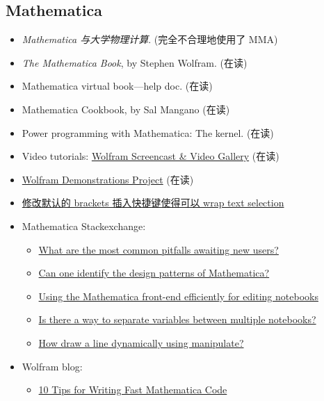 \documentclass{article}
\newcommand{\book}[1]{\textit{#1}}
\begin{document}
\subsection{Mathematica}
\begin{itemize}
    \item \book{Mathematica 与大学物理计算}. (完全不合理地使用了 MMA)
    \item \book{The Mathematica Book}, by Stephen Wolfram. (在读)
    \item Mathematica virtual book---help doc. (在读)
    \item Mathematica Cookbook, by Sal Mangano (在读)
    \item Power programming with Mathematica: The kernel. (在读)
    \item Video tutorials: \href{http://www.wolfram.com/broadcast/}{Wolfram Screencast \&{} Video Gallery} (在读)
    \item \href{http://demonstrations.wolfram.com/}{Wolfram Demonstrations Project} (在读)
    \item \href{http://stoney.sb.org/wordpress/2008/12/adding-a-keyboard-shortcut-to-mathematica-v7/}{修改默认的 brackets 插入快捷键使得可以 wrap text selection}
    \item Mathematica Stackexchange:
        \begin{itemize}
            \item \href{http://mathematica.stackexchange.com/questions/18393/what-are-the-most-common-pitfalls-awaiting-new-users}{What are the most common pitfalls awaiting new users?}
            \item \href{http://mathematica.stackexchange.com/questions/24988/can-one-identify-the-design-patterns-of-mathematica}{Can one identify the design patterns of Mathematica?}
            \item \href{http://mathematica.stackexchange.com/questions/8310/using-the-mathematica-front-end-efficiently-for-editing-notebooks}{Using the Mathematica front-end efficiently for editing notebooks}
            \item \href{http://mathematica.stackexchange.com/questions/853/is-there-a-way-to-separate-variables-between-multiple-notebooks?lq=1}{Is there a way to separate variables between multiple notebooks?}
            \item \href{http://mathematica.stackexchange.com/questions/57656/how-draw-a-line-dynamically-using-manipulate}{How draw a line dynamically using manipulate?}
        \end{itemize}
    \item Wolfram blog:
        \begin{itemize}
            \item \href{http://blog.wolfram.com/2011/12/07/10-tips-for-writing-fast-mathematica-code/}{10 Tips for Writing Fast Mathematica Code}
        \end{itemize}
\end{itemize}
\end{document}
